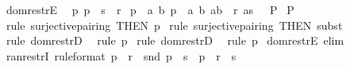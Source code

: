 \begin{isabellebody}
\isamarkupfalse%
\ dom{\isacharunderscore}restrE\ {\isacharcolon}\isanewline
{}\ p{}{\isacharcolon}\ {\isachardoublequoteopen}p\ {\isacharcolon}\ {\isacharparenleft}s\ {\isacharless}{\isacharcolon}\ r{\isacharparenright}{\isachardoublequoteclose}\isanewline
{}\ p{}{\isacharcolon}\ {\isachardoublequoteopen}{\isacharbang}{\isacharbang}\ a\ b{\isachardot}{\isacharbrackleft}{\isacharbar}\ p\ {\isacharequal}\ {\isacharparenleft}a{\isacharcomma}\ b{\isacharparenright}{\isacharsemicolon}\ {\isacharparenleft}a{\isacharcomma}b{\isacharparenright}\ {\isacharcolon}\ r{\isacharsemicolon}\ a{\isacharcolon}s\ {\isacharbar}{\isacharbrackright}\ {\isacharequal}{\isacharequal}{\isachargreater}\ P{\isachardoublequoteclose}\isanewline
{}\ {\isachardoublequoteopen}P{\isachardoublequoteclose}\isanewline
%
\isadelimproof
%
\endisadelimproof
%
\isatagproof
{}\isamarkupfalse%
\ {\isacharparenleft}rule\ surjective{\isacharunderscore}pairing\ {\isacharbrackleft}THEN\ p{}{\isacharbrackright}{\isacharparenright}\isanewline
{}\isamarkupfalse%
\ {\isacharparenleft}rule\ surjective{\isacharunderscore}pairing\ {\isacharbrackleft}THEN\ subst{\isacharbrackright}{\isacharparenright}\isanewline
{}\isamarkupfalse%
\ {\isacharparenleft}rule\ dom{\isacharunderscore}restrD{}{\isacharparenright}\ \isanewline
{}\isamarkupfalse%
\ {\isacharparenleft}rule\ p{}{\isacharparenright}\isanewline
{}\isamarkupfalse%
\ {\isacharparenleft}rule\ dom{\isacharunderscore}restrD{}{\isacharparenright}\ \isanewline
{}\isamarkupfalse%
\ {\isacharparenleft}rule\ p{}{\isacharparenright}\isanewline
{}\isamarkupfalse%
%
\endisatagproof
{\isafoldproof}%
%
\isadelimproof
\isanewline
%
\endisadelimproof
{}\isamarkupfalse%
\ dom{\isacharunderscore}restrE\ {\isacharbrackleft}elim{\isacharbang}{\isacharbrackright}\isanewline
\isanewline
{}\isamarkupfalse%
\ ran{\isacharunderscore}restrI\ {\isacharbrackleft}rule{\isacharunderscore}format{\isacharbrackright}{\isacharcolon}\ {\isachardoublequoteopen}p\ {\isacharcolon}\ r\ {\isacharminus}{\isacharminus}{\isachargreater}\ snd\ p\ {\isacharcolon}\ s\ {\isacharminus}{\isacharminus}{\isachargreater}\ p\ {\isacharcolon}\ {\isacharparenleft}r\ {\isacharcolon}{\isachargreater}\ s{\isacharparenright}{\isachardoublequoteclose}\isanewline
%
\isadelimproof
%
\endisadelimproof
%
\isatagproof
{}\isamarkupfalse%

\end{isabellebody}
